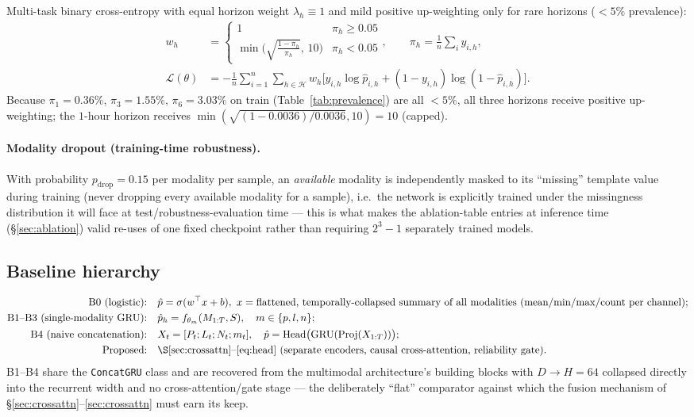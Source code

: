 \documentclass[11pt]{article}
\newcommand{\1}[1]{\mathbf{1}\!\left[#1\right]}
\begin{document}
Multi-task binary cross-entropy with equal horizon weight $\lambda_h\equiv1$ and mild positive up-weighting only for rare horizons ($<5\%$ prevalence):
\begin{align}
w_h &= \begin{cases}1 & \pi_h \ge 0.05\\ \min\!\Big(\sqrt{\tfrac{1-\pi_h}{\pi_h}},\,10\Big) & \pi_h<0.05\end{cases}, \qquad \pi_h = \tfrac1n\textstyle\sum_i y_{i,h},\\
\mathcal{L}(\theta) &= -\frac{1}{n}\sum_{i=1}^{n}\sum_{h\in\mathcal{H}} w_h\Big[y_{i,h}\log\hat p_{i,h} + (1-y_{i,h})\log(1-\hat p_{i,h})\Big].
\end{align}
Because $\pi_1 = 0.36\%,\,\pi_3=1.55\%,\,\pi_6=3.03\%$ on train (Table~\ref{tab:prevalence}) are all $<5\%$, all three horizons receive positive up-weighting; the $1$-hour horizon receives $\min(\sqrt{(1-0.0036)/0.0036},10) = 10$ (capped).

\paragraph{Modality dropout (training-time robustness).} With probability $p_{\mathrm{drop}}=0.15$ per modality per sample, an \emph{available} modality is independently masked to its ``missing'' template value during training (never dropping every available modality for a sample), i.e.\ the network is explicitly trained under the missingness distribution it will face at test/robustness-evaluation time — this is what makes the ablation-table entries at inference time (\S\ref{sec:ablation}) valid re-uses of one fixed checkpoint rather than requiring $2^3-1$ separately trained models.

\subsection{Baseline hierarchy}

\begin{align}
\text{B0 (logistic):} & \quad \hat p = \sigma(w^\top x + b), \ x = \text{flattened, temporally-collapsed summary of all modalities (mean/min/max/count per channel)};\\
\text{B1--B3 (single-modality GRU):} & \quad \hat p_h = f_{\theta_m}(M_{1:T}, S), \quad m\in\{p,l,n\}; \\
\text{B4 (naive concatenation):} & \quad X_t = [P_t; L_t; N_t; m_t], \quad \hat p = \mathrm{Head}\big(\mathrm{GRU}(\mathrm{Proj}(X_{1:T}))\big);\\
\text{Proposed:} & \quad \text{\S\ref{sec:crossattn}--\ref{eq:head} (separate encoders, causal cross-attention, reliability gate)}.
\end{align}
B1--B4 share the \texttt{ConcatGRU} class and are recovered from the multimodal architecture's building blocks with $D\to H=64$ collapsed directly into the recurrent width and no cross-attention/gate stage — the deliberately ``flat'' comparator against which the fusion mechanism of \S\ref{sec:crossattn}--\ref{sec:crossattn} must earn its keep.
\end{document}
